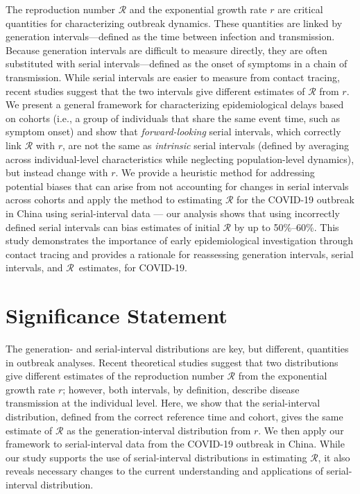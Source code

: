 \documentclass[12pt]{article}
\newcommand{\RR}{\ensuremath{{\mathcal R}}\xspace}
\begin{document}
The reproduction number \RR and the exponential growth rate $r$ are critical quantities for characterizing outbreak dynamics.
These quantities are linked by generation intervals---defined as the time between infection and transmission.
Because generation intervals are difficult to measure directly, they are often substituted with serial intervals---defined as the onset of symptoms in a chain of transmission.
While serial intervals are easier to measure from contact tracing, recent studies suggest that the two intervals give different estimates of \RR from $r$.
We present a general framework for characterizing epidemiological delays based on cohorts (i.e., a group of individuals that share the same event time, such as symptom onset) and show that \emph{forward-looking} serial intervals, which correctly link \RR with $r$, are not the same as \emph{intrinsic} serial intervals (defined by averaging across individual-level characteristics while neglecting population-level dynamics), but instead change with $r$.
We provide a heuristic method for addressing potential biases that can arise from not accounting for changes in serial intervals across cohorts and apply the method to estimating \RR for the COVID-19 outbreak in China using serial-interval data --- our analysis shows that using incorrectly defined serial intervals can bias estimates of initial \RR by up to 50\%--60\%.
This study demonstrates the importance of early epidemiological investigation through contact tracing and provides a rationale for reassessing generation intervals, serial intervals, and \RR\ estimates, for COVID-19.

\section*{Significance Statement}

The generation- and serial-interval distributions are key, but different, quantities in outbreak analyses.
Recent theoretical studies suggest that two distributions give different estimates of the reproduction number \RR from the exponential growth rate $r$;
however, both intervals, by definition, describe disease transmission at the individual level.
Here, we show that the serial-interval distribution, defined from the correct reference time and cohort, gives the same estimate of \RR as the generation-interval distribution from $r$.
We then apply our framework to serial-interval data from the COVID-19 outbreak in China.
While our study supports the use of serial-interval distributions in estimating \RR, it also reveals necessary changes to the current understanding and applications of serial-interval distribution.
\end{document}
